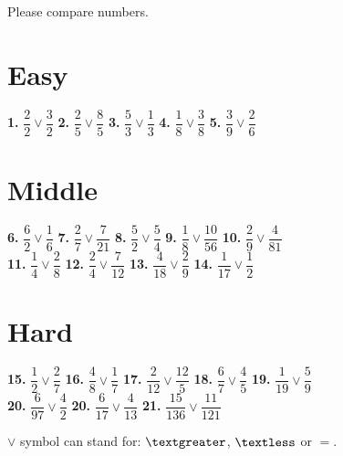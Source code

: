 \documentclass[a4paper, 12pt]{article}
\begin{document}
	{\large Please compare numbers.}	
	
	\section* {{\Large Easy}}
	
	{\Large \textbf{1.} $\dfrac{2}{2}\vee\dfrac{3}{2}$ \hspace{0.5cm}
		   \textbf{2.} $\dfrac{2}{5}\vee\dfrac{8}{5}$ \hspace{0.5cm}
		   \textbf{3.} $\dfrac{5}{3}\vee\dfrac{1}{3}$ \hspace{0.5cm}
		   \textbf{4.} $\dfrac{1}{8}\vee\dfrac{3}{8}$ \hspace{0.5cm}
           \textbf{5.} $\dfrac{3}{9}\vee\dfrac{2}{6}$
	
	\section* {{\Large Middle}}
	
	{\Large \textbf{6.} $\dfrac{6}{2}\vee\dfrac{1}{6}$ \hspace{0.5cm}
		   \textbf{7.} $\dfrac{2}{7}\vee\dfrac{7}{21}$ \hspace{0.5cm}
		   \textbf{8.} $\dfrac{5}{2}\vee\dfrac{5}{4}$ \hspace{0.5cm}
		   \textbf{9.} $\dfrac{1}{8}\vee\dfrac{10}{56}$ \hspace{0.5cm}
		   \textbf{10.} $\dfrac{2}{9}\vee\dfrac{4}{81}$ \\ [0.5cm]
		   \textbf{11.} $\dfrac{1}{4}\vee\dfrac{2}{8}$ \hspace{0.5cm}
		   \textbf{12.} $\dfrac{2}{4}\vee\dfrac{7}{12}$ \hspace{0.5cm}
		   \textbf{13.} $\dfrac{4}{18}\vee\dfrac{2}{9}$ \hspace{0.5cm}
		   \textbf{14.} $\dfrac{1}{17}\vee\dfrac{1}{2}$ \hspace{0.5cm}}
	
	\section* {{\Large Hard}}

		   \textbf{15.} $\dfrac{1}{2}\vee\dfrac{2}{7}$ \hspace{0.5cm}
		   \textbf{16.} $\dfrac{4}{8}\vee\dfrac{1}{7}$ \hspace{0.5cm}
		   \textbf{17.} $\dfrac{2}{12}\vee\dfrac{12}{5}$ \hspace{0.5cm}
		   \textbf{18.} $\dfrac{6}{7}\vee\dfrac{4}{5}$  \hspace{0.5cm}
		   \textbf{19.} $\dfrac{1}{19}\vee\dfrac{5}{9}$ \\ [0.5cm]
		   \textbf{20.} $\dfrac{6}{97}\vee\dfrac{4}{2}$  \hspace{0.5cm}
		   \textbf{20.} $\dfrac{6}{17}\vee\dfrac{4}{13}$  \hspace{0.5cm}
		   \textbf{21.} $\dfrac{15}{136}\vee\dfrac{11}{121}$  \\ [0.5cm]}
	   
	 {\large $\vee$ symbol can stand for: $\textgreater$, $\textless$ or $=$.}
		
\end{document}
